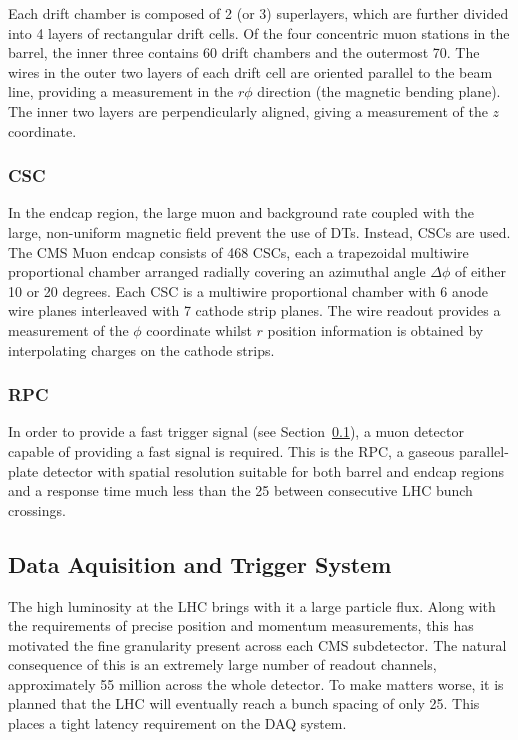 Each drift chamber is composed of 2 (or 3) superlayers, which are further
divided into 4 layers of rectangular drift cells. Of the four concentric muon
stations in the barrel, the inner three contains 60 drift chambers and the
outermost 70. The wires in the outer two layers of each drift cell are oriented
parallel to the beam line, providing a measurement in the $r\phi$ direction (the
magnetic bending plane). The inner two layers are perpendicularly aligned,
giving a measurement of the $z$ coordinate.

\subsubsection{\acl{CSC}}
In the endcap region, the large muon and background rate coupled with the large,
non-uniform magnetic field prevent the use of \ac{DT}s. Instead, \acl{CSC}s are
used. The CMS Muon endcap consists of 468 \ac{CSC}s, each a trapezoidal
multiwire proportional chamber arranged radially covering an azimuthal angle
$\Delta\phi$ of either 10 or 20 degrees. Each \ac{CSC} is a multiwire
proportional chamber with 6 anode wire planes interleaved with 7 cathode strip
planes. The wire readout provides a measurement of the $\phi$ coordinate whilst
$r$ position information is obtained by interpolating charges on the cathode
strips.

\subsubsection{\acl{RPC}}
In order to provide a fast trigger signal (see Section~\ref{sec:trigger}), a
muon detector capable of providing a fast signal is required. This is the
\acl{RPC}, a gaseous parallel-plate detector with spatial resolution suitable
for both barrel and endcap regions and a response time much less than the
\unit{25}{\nano\second} between consecutive \ac{LHC} bunch crossings.

\subsection{Data Aquisition and Trigger System}
\label{sec:trigger}
The high luminosity at the \ac{LHC} brings with it a large particle flux. Along
with the requirements of precise position and momentum measurements, this has
motivated the fine granularity present across each \ac{CMS} subdetector. The
natural consequence of this is an extremely large number of readout channels,
approximately 55 million across the whole detector. To make matters
worse, it is planned that the \ac{LHC} will eventually reach a bunch spacing of
only \unit{25}{\nano\second}. This places a tight latency requirement on the
\ac{DAQ} system.

